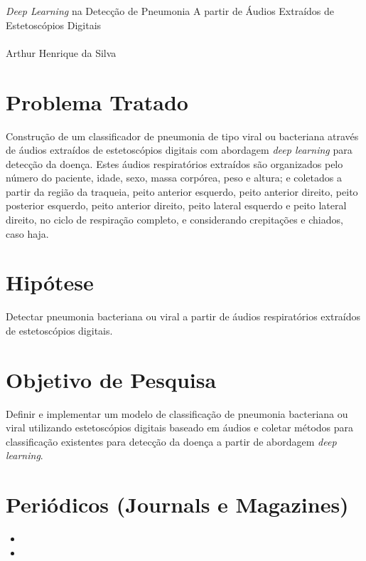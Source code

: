 \documentclass[12pt]{article}
\begin{document}
\begin{center}
{\large \textit{Deep Learning} na Detecção de Pneumonia A partir de Áudios Extraídos de Estetoscópios Digitais} \\  %
\ \\
Arthur Henrique da Silva \\
\end{center}

\begin{multicols}{2}

\section{Problema Tratado}
Construção de um classificador de pneumonia de tipo viral ou bacteriana através de áudios extraídos de estetoscópios digitais com abordagem 
\textit{deep learning} para detecção da doença. Estes áudios respiratórios extraídos são organizados pelo número do paciente, idade, sexo, massa corpórea, peso e altura; e coletados a partir da região da traqueia, peito anterior esquerdo, peito anterior direito, peito posterior esquerdo, peito anterior direito, peito lateral esquerdo e peito lateral direito, no ciclo de respiração completo, e considerando crepitações e chiados, caso haja.

\section{Hipótese}
Detectar pneumonia bacteriana ou viral a partir de áudios respiratórios extraídos de estetoscópios digitais.
\ \\
\section{Objetivo de Pesquisa}

Definir e implementar um modelo de classificação de pneumonia bacteriana ou viral utilizando estetoscópios digitais baseado em áudios e coletar métodos para classificação existentes para detecção da doença a partir de abordagem \textit{deep learning}.

\section{Periódicos (Journals e Magazines)}
\begin{itemize}
    \item {}
    \item {}


\end{itemize}
\end{multicols}
\end{document}

